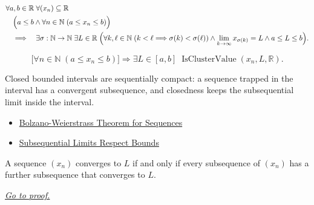 \begin{remark*}
\[
\begin{aligned}
&\forall a,b\in\mathbb{R}\;\forall (x_n)\subseteq\mathbb{R}\\
&\quad\Bigl(
  a\le b
  \land
  \forall n\in\mathbb{N}\;(a\le x_n\le b)
\Bigr)\\
&\quad\Longrightarrow\quad
\exists \sigma:\mathbb{N}\to\mathbb{N}\;\exists L\in\mathbb{R}\;
\Bigl(
  \forall k,\ell\in\mathbb{N}\;(k<\ell\Longrightarrow\sigma(k)<\sigma(\ell))
  \land
  \lim_{k\to\infty}x_{\sigma(k)}=L
  \land
  a\le L\le b
\Bigr).
\end{aligned}
\]
\end{remark*}

\begin{remark*}
\[
\bigl[\forall n\in\mathbb{N}\;(a\le x_n\le b)\bigr]
\Longrightarrow
\exists L\in[a,b]\;\operatorname{IsClusterValue}(x_n,L,\mathbb{R}).
\]
\end{remark*}

\begin{remark*}[Interpretation]
Closed bounded intervals are sequentially compact: a sequence trapped in the
interval has a convergent subsequence, and closedness keeps the subsequential
limit inside the interval.
\end{remark*}

\begin{dependencies}
\begin{itemize}
  \item \hyperref[thm:bolzano-weierstrass-sequences]{Bolzano-Weierstrass Theorem for Sequences}
  \item \hyperref[thm:subsequential-limits-respect-bounds]{Subsequential Limits Respect Bounds}
\end{itemize}
\end{dependencies}

\begin{theorem}
\label{thm:subsequence-principle}
A sequence $(x_n)$ converges to $L$ if and only if every subsequence of $(x_n)$ has a further subsequence that converges to $L$.

\smallskip
\noindent
\hyperref[prf:subsequence-principle]{\textit{Go to proof.}}
\end{theorem}

